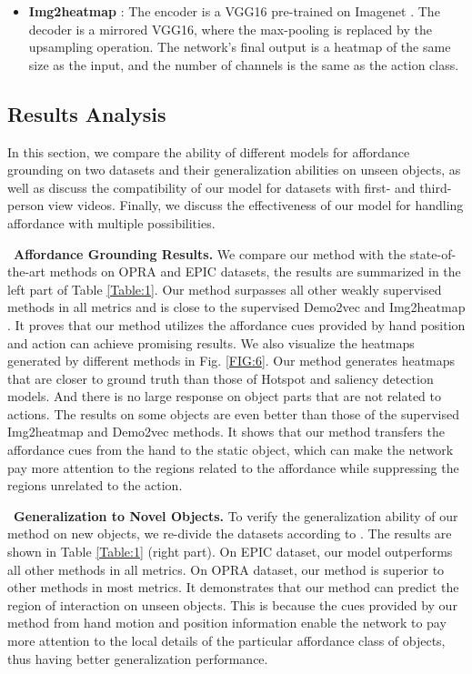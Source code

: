 \documentclass[journal,twoside]{IEEEtran}
\newcommand{\myPara}[1]{\vspace{5pt}\noindent~\textbf{#1} \quad}
\begin{document}
\begin{itemize}
\item []
\textbf{Img2heatmap} \cite{interaction-hotspots}: The encoder is a VGG16 \cite{DBLP:journals/corr/SimonyanZ14a} pre-trained on Imagenet \cite{DBLP:conf/cvpr/DengDSLL009}. The decoder is a mirrored VGG16, where the max-pooling is replaced by the upsampling operation. The network's final output is a heatmap of the same size as the input, and the number of channels is the same as the action class.

\end{itemize}

\subsection{Results Analysis}
\label{results_analysis}
In this section, we compare the ability of different models for affordance grounding on two datasets and their generalization abilities on unseen objects, as well as discuss the compatibility of our model for datasets with first- and third-person view videos. Finally, we discuss the effectiveness of our model for handling affordance with multiple possibilities.

\myPara{Affordance Grounding Results.} 
We compare our method with the state-of-the-art methods on OPRA \cite{demo2vec2018cvpr} and EPIC \cite{Damen2018EPICKITCHENS} datasets, the results are summarized in the left part of Table \ref{Table:1}. Our method surpasses all other weakly supervised methods in all metrics and is close to the supervised Demo2vec \cite{demo2vec2018cvpr} and Img2heatmap \cite{interaction-hotspots}. It proves that our method utilizes the affordance cues provided by hand position and action can achieve promising results. We also visualize the heatmaps generated by different methods in Fig. \ref{FIG:6}. Our method generates heatmaps that are closer to ground truth than those of Hotspot and saliency detection models. And there is no large response on object parts that are not related to actions. The results on some objects are even better than those of the supervised Img2heatmap \cite{interaction-hotspots} and Demo2vec \cite{demo2vec2018cvpr} methods. It shows that our method transfers the affordance cues from the hand to the static object, which can make the network pay more attention to the regions related to the affordance while suppressing the regions unrelated to the action.

\myPara{Generalization to Novel Objects.}
To verify the generalization ability of our method on new objects, we re-divide the datasets according to \cite{interaction-hotspots}. The results are shown in Table \ref{Table:1} (right part). On EPIC \cite{Damen2018EPICKITCHENS} dataset, our model outperforms all other methods in all metrics. On OPRA \cite{demo2vec2018cvpr} dataset, our method is superior to other methods in most metrics. It demonstrates that our method can predict the region of interaction on unseen objects. This is because the cues provided by our method from hand motion and position information enable the network to pay more attention to the local details of the particular affordance class of objects, thus having better generalization performance.
\end{document}
